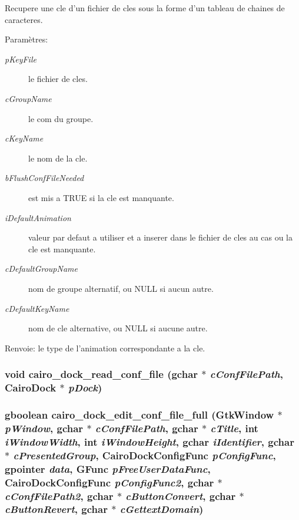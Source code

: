 Recupere une cle d'un fichier de cles sous la forme d'un tableau de chaines de caracteres. \begin{Desc}
\item[Paramètres:]
\begin{description}
\item[{\em pKeyFile}]le fichier de cles. \item[{\em cGroupName}]le com du groupe. \item[{\em cKeyName}]le nom de la cle. \item[{\em bFlushConfFileNeeded}]est mis a TRUE si la cle est manquante. \item[{\em iDefaultAnimation}]valeur par defaut a utiliser et a inserer dans le fichier de cles au cas ou la cle est manquante. \item[{\em cDefaultGroupName}]nom de groupe alternatif, ou NULL si aucun autre. \item[{\em cDefaultKeyName}]nom de cle alternative, ou NULL si aucune autre. \end{description}
\end{Desc}
\begin{Desc}
\item[Renvoie:]le type de l'animation correspondante a la cle. \end{Desc}
\subsubsection{\setlength{\rightskip}{0pt plus 5cm}void cairo\_\-dock\_\-read\_\-conf\_\-file (gchar $\ast$ {\em cConfFilePath}, {\bf CairoDock} $\ast$ {\em pDock})}\label{cairo-dock-config_8h_c64f3ee3060851d08a10b674983ceef6}


\subsubsection{\setlength{\rightskip}{0pt plus 5cm}gboolean cairo\_\-dock\_\-edit\_\-conf\_\-file\_\-full (GtkWindow $\ast$ {\em pWindow}, gchar $\ast$ {\em cConfFilePath}, gchar $\ast$ {\em cTitle}, int {\em iWindowWidth}, int {\em iWindowHeight}, gchar {\em iIdentifier}, gchar $\ast$ {\em cPresentedGroup}, {\bf CairoDockConfigFunc} {\em pConfigFunc}, gpointer {\em data}, GFunc {\em pFreeUserDataFunc}, {\bf CairoDockConfigFunc} {\em pConfigFunc2}, gchar $\ast$ {\em cConfFilePath2}, gchar $\ast$ {\em cButtonConvert}, gchar $\ast$ {\em cButtonRevert}, gchar $\ast$ {\em cGettextDomain})}\label{cairo-dock-config_8h_dd9495916490fa41367914e6ca0ed982}


